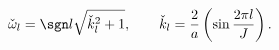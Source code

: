 \begin{equation}
  \check{\omega}_l=\sgn l\sqrt{\check{k}_l^2+1},\qquad
  \check{k}_l=\frac{2}{a}\left(\sin\frac{2\pi l}{J}\right).
\end{equation}

